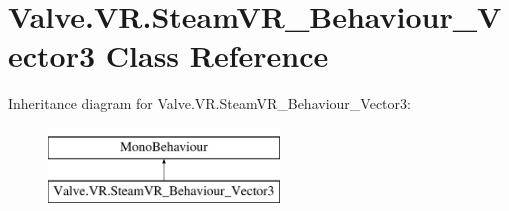 \hypertarget{class_valve_1_1_v_r_1_1_steam_v_r___behaviour___vector3}{}\section{Valve.\+V\+R.\+Steam\+V\+R\+\_\+\+Behaviour\+\_\+\+Vector3 Class Reference}
\label{class_valve_1_1_v_r_1_1_steam_v_r___behaviour___vector3}
Inheritance diagram for Valve.\+V\+R.\+Steam\+V\+R\+\_\+\+Behaviour\+\_\+\+Vector3\+:\begin{figure}[H]
\begin{center}
\leavevmode
\includegraphics[height=2.000000cm]{class_valve_1_1_v_r_1_1_steam_v_r___behaviour___vector3}
\end{center}
\end{figure}
